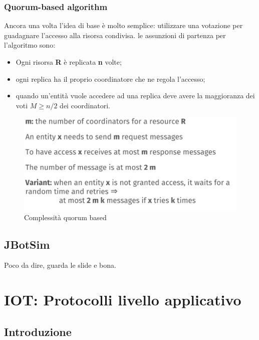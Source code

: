 \documentclass[12pt]{article}
\begin{document}
    	\subsubsection{Quorum-based algorithm}
    		Ancora una volta l'idea di base è molto semplice: utilizzare una votazione per guadagnare l'accesso alla risorsa condivisa. le assunzioni di partenza per l'algoritmo sono:
    		\begin{itemize}
    			\item Ogni risorsa \textbf{R} è replicata \textbf{n} volte;
    			\item ogni replica ha il proprio coordinatore che ne regola l'accesso;
    			\item quando un'entità vuole accedere ad una replica deve avere la maggioranza dei voti $M \geq n/2$ dei coordinatori.
    		\end{itemize} 
    		\begin{figure}[h!]
    			\centering
    			\includegraphics[scale=0.4]{img/quorum.png}
    			\caption{Complessità quorum based}
    		\end{figure}
    \subsection{JBotSim }
    	Poco da dire, guarda le slide e bona. 
    
\section{IOT: Protocolli livello applicativo}
	\subsection{Introduzione}
\end{document}
